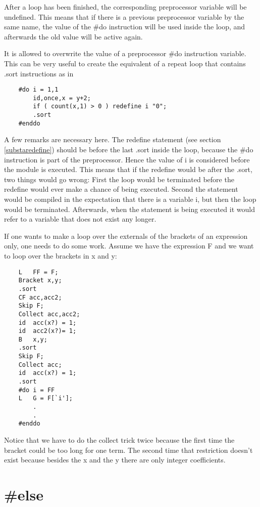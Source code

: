 After a loop has been finished, the corresponding preprocessor variable 
will be undefined. This means that if there is a previous preprocessor 
variable by the same name, the value of the \#do instruction will be used 
inside the loop, and afterwards the old value will be active again.

It is allowed to overwrite the value of a preprocessor \#do instruction 
variable. This can be very useful to create the equivalent of a repeat loop 
that contains .sort instructions as in
\begin{verbatim}
    #do i = 1,1
        id,once,x = y+2;
        if ( count(x,1) > 0 ) redefine i "0";
        .sort
    #enddo
\end{verbatim}
A few remarks are necessary here. The redefine statement 
(see section \ref{substaredefine}) should be before the last 
.sort inside the loop, because the \#do instruction is part of 
the preprocessor. Hence the value of i is considered before the module is 
executed. This means that if the redefine would be after the .sort, two 
things would go wrong: First the loop would be terminated before the 
redefine would ever make a chance of being executed. Second the statement 
would be compiled in the expectation that there is a variable i, but then 
the loop would be terminated. Afterwards, when the statement is being 
executed it would refer to a variable that does not exist any longer. 

If one wants to make a loop over the externals of the brackets of an 
expression only, one needs to do some work. Assume we have the expression F 
and we want to loop over the brackets in x and y:
\begin{verbatim}
    L   FF = F;
    Bracket x,y;
    .sort
    CF acc,acc2;
    Skip F;
    Collect acc,acc2;
    id  acc(x?) = 1;
    id  acc2(x?)= 1;
    B   x,y;
    .sort
    Skip F;
    Collect acc;
    id  acc(x?) = 1;
    .sort
    #do i = FF
    L   G = F[`i'];
        .
        .
    #enddo
\end{verbatim}
Notice that we have to do the collect trick twice because 
the first time the bracket could be too long for one term. The second time 
that restriction doesn't exist because besides the x and the y there are 
only integer coefficients.


\section{\#else}
\label{preelse}

